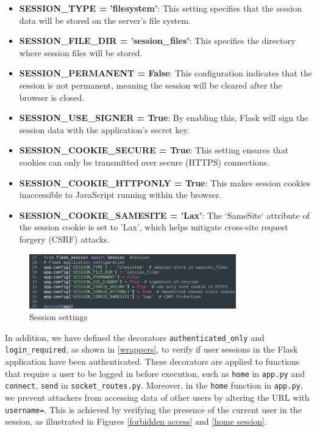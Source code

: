 \documentclass[12pt]{article}
\begin{document}
        \begin{itemize}
            \item \textbf{SESSION\_TYPE = 'filesystem'}: This setting specifies that the session data will be stored on the server's file system.

            \item \textbf{SESSION\_FILE\_DIR = 'session\_files'}: This specifies the directory where session files will be stored. 

            \item \textbf{SESSION\_PERMANENT = False}: This configuration indicates that the session is not permanent, meaning the session will be cleared after the browser is closed.

            \item \textbf{SESSION\_USE\_SIGNER = True}: By enabling this, Flask will sign the session data with the application's secret key.

            \item \textbf{SESSION\_COOKIE\_SECURE = True}: This setting ensures that cookies can only be transmitted over secure (HTTPS) connections. 

            \item \textbf{SESSION\_COOKIE\_HTTPONLY = True}: This makes session cookies inaccessible to JavaScript running within the browser. 

            \item \textbf{SESSION\_COOKIE\_SAMESITE = 'Lax'}: The `SameSite` attribute of the session cookie is set to 'Lax', which helps mitigate cross-site request forgery (CSRF) attacks. 
        \end{itemize}

        \begin{figure}[H]
            \centering
            \includegraphics[width=0.8\textwidth]{graphs/session_settings.jpg}
            \caption{Session settings}
            \label{Session setting}
        \end{figure}

        In addition, we have defined the decorators \texttt{authenticated\_only} and \texttt{login\_required}, as shown in \ref{wrappers}, to verify if user sessions in the Flask application have been authenticated. These decorators are applied to functions that require a user to be logged in before execution, such as \texttt{home} in \texttt{app.py} and \texttt{connect}, \texttt{send} in \texttt{socket\_routes.py}. Moreover, in the \texttt{home} function in \texttt{app.py}, we prevent attackers from accessing data of other users by altering the URL with \texttt{username=}. This is achieved by verifying the presence of the current user in the session, as illustrated in Figures \ref{forbidden access} and \ref{home session}.
\end{document}
